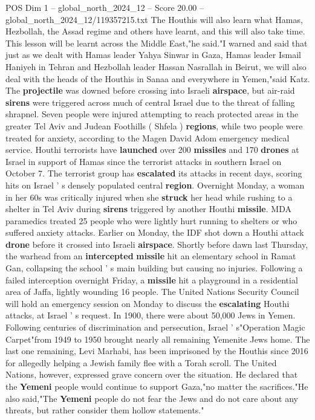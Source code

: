 \begin{textsample}{POS Dim 1 – global\_north\_2024\_12 – Score 20.00 – global\_north\_2024\_12/119357215.txt}
The Houthis will also learn what Hamas, Hezbollah, the Assad regime and others have learnt, and this will also take time.
This lesson will be learnt across the Middle East,"he said."I warned and said that just as we dealt with Hamas leader Yahya Sinwar in Gaza, Hamas leader Ismail Haniyeh in Tehran and Hezbollah leader Hassan Nasrallah in Beirut, we will also deal with the heads of the Houthis in Sanaa and everywhere in Yemen,"said Katz.
The \textbf{projectile} was downed before crossing into Israeli \textbf{airspace}, but air-raid \textbf{sirens} were triggered across much of central Israel due to the threat of falling shrapnel.
Seven people were injured attempting to reach protected areas in the greater Tel Aviv and Judean Foothills ( Shfela ) \textbf{regions}, while two people were treated for anxiety, according to the Magen David Adom emergency medical service.
Houthi terrorists have \textbf{launched} over 200 \textbf{missiles} and 170 \textbf{drones} at Israel in support of Hamas since the terrorist attacks in southern Israel on October 7.
The terrorist group has \textbf{escalated} its attacks in recent days, scoring hits on Israel ' s densely populated central \textbf{region}.
Overnight Monday, a woman in her 60s was critically injured when she \textbf{struck} her head while rushing to a shelter in Tel Aviv during \textbf{sirens} triggered by another Houthi \textbf{missile}.
MDA paramedics treated 25 people who were lightly hurt running to shelters or who suffered anxiety attacks.
Earlier on Monday, the IDF shot down a Houthi attack \textbf{drone} before it crossed into Israeli \textbf{airspace}.
Shortly before dawn last Thursday, the warhead from an \textbf{intercepted} \textbf{missile} hit an elementary school in Ramat Gan, collapsing the school ' s main building but causing no injuries.
Following a failed interception overnight Friday, a \textbf{missile} hit a playground in a residential area of Jaffa, lightly wounding 16 people.
The United Nations Security Council will hold an emergency session on Monday to discuss the \textbf{escalating} Houthi attacks, at Israel ' s request.
In 1900, there were about 50,000 Jews in Yemen.
Following centuries of discrimination and persecution, Israel ' s"Operation Magic Carpet"from 1949 to 1950 brought nearly all remaining Yemenite Jews home.
The last one remaining, Levi Marhabi, has been imprisoned by the Houthis since 2016 for allegedly helping a Jewish family flee with a Torah scroll.
The United Nations, however, expressed grave concern over the situation.
He declared that the \textbf{Yemeni} people would continue to support Gaza,"no matter the sacrifices."He also said,"The \textbf{Yemeni} people do not fear the Jews and do not care about any threats, but rather consider them hollow statements."

\end{textsample}
